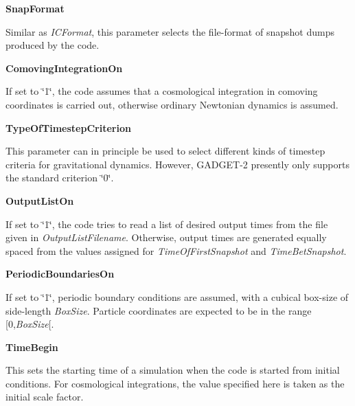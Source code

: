 \begin{DoxyItemize}
\item {\bfseries \-Snap\-Format} \par
 \-Similar as {\itshape \-I\-C\-Format\/}, this parameter selects the file-\/format of snapshot dumps produced by the code.
\end{DoxyItemize}


\begin{DoxyItemize}
\item {\bfseries \-Comoving\-Integration\-On} \par
 \-If set to \char`\"{}1\char`\"{}, the code assumes that a cosmological integration in comoving coordinates is carried out, otherwise ordinary \-Newtonian dynamics is assumed.
\end{DoxyItemize}


\begin{DoxyItemize}
\item {\bfseries \-Type\-Of\-Timestep\-Criterion} \par
 \-This parameter can in principle be used to select different kinds of timestep criteria for gravitational dynamics. \-However, \-G\-A\-D\-G\-E\-T-\/2 presently only supports the standard criterion \char`\"{}0\char`\"{}.
\end{DoxyItemize}


\begin{DoxyItemize}
\item {\bfseries \-Output\-List\-On} \par
 \-If set to \char`\"{}1\char`\"{}, the code tries to read a list of desired output times from the file given in {\itshape \-Output\-List\-Filename\/}. \-Otherwise, output times are generated equally spaced from the values assigned for {\itshape \-Time\-Of\-First\-Snapshot\/} and {\itshape \-Time\-Bet\-Snapshot\/}.
\end{DoxyItemize}


\begin{DoxyItemize}
\item {\bfseries \-Periodic\-Boundaries\-On} \par
 \-If set to \char`\"{}1\char`\"{}, periodic boundary conditions are assumed, with a cubical box-\/size of side-\/length {\itshape \-Box\-Size\/}. \-Particle coordinates are expected to be in the range \mbox{[}0,{\itshape \-Box\-Size\/}\mbox{[}.
\end{DoxyItemize}


\begin{DoxyItemize}
\item {\bfseries \-Time\-Begin} \par
 \-This sets the starting time of a simulation when the code is started from initial conditions. \-For cosmological integrations, the value specified here is taken as the initial scale factor.
\end{DoxyItemize}


